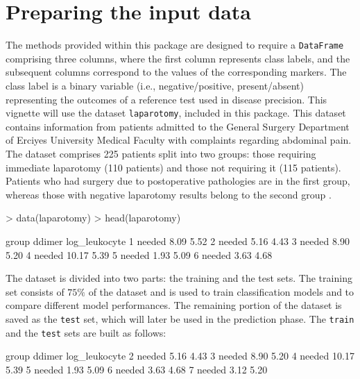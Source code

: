 \documentclass[10pt]{article}
\newcommand{\Rclass}[1]{\texttt{#1}}
\begin{document}
\section{Preparing the input data}
The methods provided within this package are designed to require a \Rclass{DataFrame} comprising three columns, where the first column represents class labels, and the subsequent columns correspond to the values of the corresponding markers. The class label is a binary variable (i.e., negative/positive, present/absent) representing the outcomes of a reference test used in disease precision. 
This vignette will use the dataset \texttt{laparotomy}, included in this package. This dataset contains information from patients admitted to the General Surgery Department of Erciyes University Medical Faculty with complaints regarding abdominal pain. The dataset comprises 225 patients split into two groups: those requiring immediate laparotomy (110 patients) and those not requiring it (115 patients). Patients who had surgery due to postoperative pathologies are in the first group, whereas those with negative laparotomy results belong to the second group \citep{akyildiz2010value}. 
\begin{Schunk}
\begin{Sinput}
> data(laparotomy)
> head(laparotomy)
\end{Sinput}
\begin{Soutput}
   group ddimer log_leukocyte
1 needed   8.09          5.52
2 needed   5.16          4.43
3 needed   8.90          5.20
4 needed  10.17          5.39
5 needed   1.93          5.09
6 needed   3.63          4.68
\end{Soutput}
\end{Schunk}
The dataset is divided into two parts: the training and the test sets. The training set consists of $75\%$ of the dataset and is used to train classification models and to compare different model performances. The remaining portion of the dataset is saved as the \texttt{test} set, which will later be used in the prediction phase.
The \texttt{train} and the \texttt{test} sets are built as follows:
\begin{Schunk}
\begin{Soutput}
   group ddimer log_leukocyte
2 needed   5.16          4.43
3 needed   8.90          5.20
4 needed  10.17          5.39
5 needed   1.93          5.09
6 needed   3.63          4.68
7 needed   3.12          5.20
\end{Soutput}
\end{Schunk}
\end{document}
